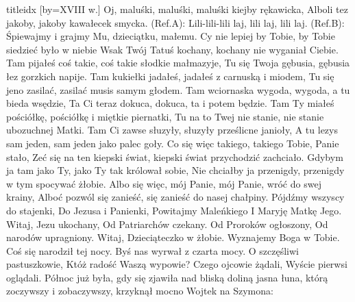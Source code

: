 \documentclass[a5paper, portrait, 12pt]{mwart}
\begin{document}
\begin{songs}{titleidx}
[by={XVIII w.}]
\beginverse
    Oj, maluśki, maluśki, maluśki kiejby rękawicka,
    Alboli tez jakoby, jakoby kawałecek smycka.
\endverse
\beginchorus
        (Ref.A): Lili-lili-lili laj, lili laj, lili laj.
        (Ref.B): Śpiewajmy i grajmy Mu, dzieciątku, małemu.
\endchorus
\beginverse
    Cy nie lepiej by Tobie, by Tobie siedzieć było w niebie
    Wsak Twój Tatuś kochany, kochany nie wyganiał Ciebie.
\endverse
\beginverse
    Tam pijałeś coś takie, coś takie słodkie małmazyje,
    Tu się Twoja gębusia, gębusia łez gorzkich napije.
\endverse
\beginverse
    Tam kukiełki jadałeś, jadałeś z carnuską i miodem,
    Tu się jeno zasilać, zasilać musis samym głodem.
\endverse
\beginverse
    Tam wciornaska wygoda, wygoda, a tu bieda wsędzie,
    Ta Ci teraz dokuca, dokuca, ta i potem będzie.
\endverse
\beginverse
    Tam Ty miałeś pościółkę, pościółkę i miętkie piernatki,
    Tu na to Twej nie stanie, nie stanie ubozuchnej Matki.
\endverse
\beginverse
    Tam Ci zawse słuzyły, słuzyły prześlicne janioły,
    A tu lezys sam jeden, sam jeden jako palec goły.
\endverse
\beginverse
    Co się więc takiego, takiego Tobie, Panie stało,
    Zeć się na ten kiepski świat, kiepski świat przychodzić zachciało.
\endverse
\beginverse
    Gdybym ja tam jako Ty, jako Ty tak królował sobie,
    Nie chciałby ja przenigdy, przenigdy w tym spocywać żłobie.
\endverse
\beginverse
    Albo się więc, mój Panie, mój Panie, wróć do swej krainy,
    Alboć pozwól się zanieść, się zanieść do nasej chałpiny.
\endverse
\endsong
\beginverse
    Pójdźmy wszyscy do stajenki,
    Do Jezusa i Panienki,
\endverse
\beginchorus
    Powitajmy Maleńkiego
    I Maryję Matkę Jego. 
\endchorus
\beginverse
    Witaj, Jezu ukochany,
    Od Patriarchów czekany.
\endverse
\beginchorus
    Od Proroków ogłoszony,
    Od narodów upragniony. 
\endchorus
\beginverse
    Witaj, Dzieciąteczko w żłobie.
    Wyznajemy Boga w Tobie.
\endverse
\beginchorus
    Coś się narodził tej nocy.
    Byś nas wyrwał z czarta mocy. 
\endchorus
\beginverse
    O szczęśliwi pastuszkowie,
    Któż radość Waszą wypowie?
\endverse
\beginchorus
    Czego ojcowie żądali,
    Wyście pierwsi oglądali.  
\endchorus
\endsong
\beginverse
Północ już była, gdy się zjawiła
nad bliską doliną jasna łuna,
którą zoczywszy i zobaczywszy,
krzyknął mocno Wojtek na Szymona:
\endverse
\beginchorus

\end{songs}
\end{document}
